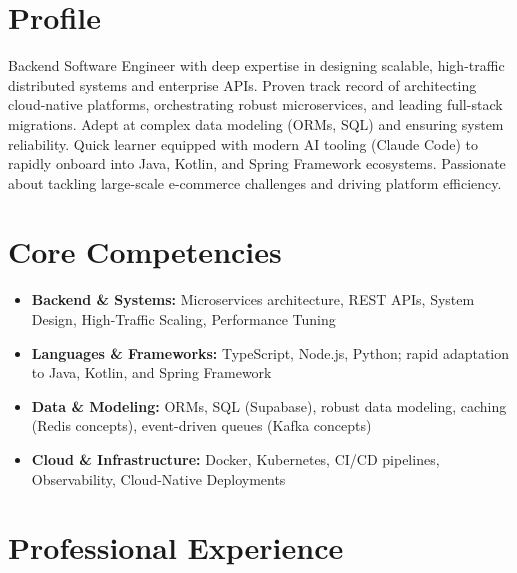 \documentclass[11pt,a4paper,sans]{moderncv}
\begin{document}
\makecvtitle

\section{Profile}
Backend Software Engineer with deep expertise in designing scalable, high-traffic distributed systems and enterprise APIs. Proven track record of architecting cloud-native platforms, orchestrating robust microservices, and leading full-stack migrations. Adept at complex data modeling (ORMs, SQL) and ensuring system reliability. Quick learner equipped with modern AI tooling (Claude Code) to rapidly onboard into Java, Kotlin, and Spring Framework ecosystems. Passionate about tackling large-scale e-commerce challenges and driving platform efficiency.

\section{Core Competencies}
\begin{itemize}
\item \textbf{Backend \& Systems:} Microservices architecture, REST APIs, System Design, High-Traffic Scaling, Performance Tuning
\item \textbf{Languages \& Frameworks:} TypeScript, Node.js, Python; rapid adaptation to Java, Kotlin, and Spring Framework
\item \textbf{Data \& Modeling:} ORMs, SQL (Supabase), robust data modeling, caching (Redis concepts), event-driven queues (Kafka concepts)
\item \textbf{Cloud \& Infrastructure:} Docker, Kubernetes, CI/CD pipelines, Observability, Cloud-Native Deployments
\end{itemize}

\section{Professional Experience}

\end{document}
